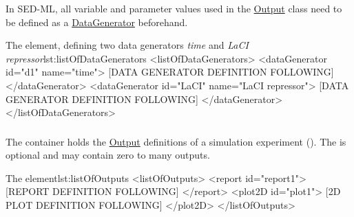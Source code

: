 In SED-ML, all variable and parameter values used in the \hyperref[class:output]{Output} class need to be defined as a \hyperref[class:dataGenerator]{DataGenerator} beforehand.



\begin{myXmlLst}{The  element, defining two data generators \emph{time} and \emph{LaCI repressor}}{lst:listOfDataGenerators}
<listOfDataGenerators>
	<dataGenerator id="d1" name="time">
		[DATA GENERATOR DEFINITION FOLLOWING]
	</dataGenerator>
	<dataGenerator id="LaCI" name="LaCI repressor">
		[DATA GENERATOR DEFINITION FOLLOWING]
	</dataGenerator>
</listOfDataGenerators>
\end{myXmlLst}


\subsubsection{}
\label{sec:listOfOutputs}
The  container holds the \hyperref[class:output]{Output} definitions of a simulation experiment (). The  is optional and may contain zero to many outputs.

\begin{myXmlLst}{The  element}{lst:listOfOutputs}
<listOfOutputs>
	<report id="report1">
		[REPORT DEFINITION FOLLOWING]
	</report>
	<plot2D id="plot1">
		[2D PLOT DEFINITION FOLLOWING] 
	</plot2D>
</listOfOutputs>
\end{myXmlLst}
